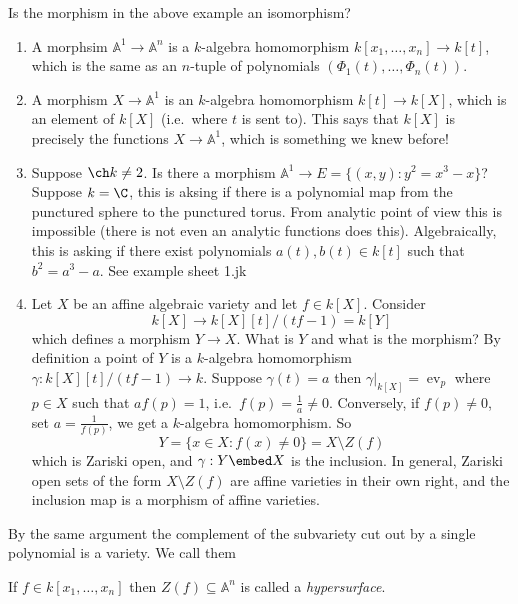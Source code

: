 \documentclass[a4paper]{article}
\renewcommand{\A}{\mathbb{A}}
\begin{document}
\begin{question}
  Is the morphism in the above example an isomorphism?
\end{question}

\begin{eg}\leavevmode
  \begin{enumerate}
  \item A morphsim \(\A^1 \to \A^n\) is a \(k\)-algebra homomorphism \(k[x_1, \dots, x_n] \to k[t]\), which is the same as an \(n\)-tuple of polynomials \((\Phi_1(t), \dots, \Phi_n(t))\).
  \item A morphism \(X \to \A^1\) is an \(k\)-algebra homomorphism \(k[t] \to k[X]\), which is an element of \(k[X]\) (i.e.\ where \(t\) is sent to). This says that \(k[X]\) is precisely the functions \(X \to \A^1\), which is something we knew before!
  \item Suppose \(\ch k \neq 2\). Is there a morphism \(\A^1 \to E = \{(x, y): y^2 = x^3 - x\}\)? Suppose \(k = \C\), this is aksing if there is a polynomial map from the punctured sphere to the punctured torus. From analytic point of view this is impossible (there is not even an analytic functions does this). Algebraically, this is asking if there exist polynomials \(a(t), b(t) \in k[t]\) such that \(b^2 = a^3 - a\). See example sheet 1.jk
  \item Let \(X\) be an affine algebraic variety and let \(f \in k[X]\). Consider
    \[
      k[X] \to k[X][t]/(tf - 1) = k[Y]
    \]
    which defines a morphism \(Y \to X\). What is \(Y\) and what is the morphism? By definition a point of \(Y\) is a \(k\)-algebra homomorphism \(\gamma: k[X][t]/(tf - 1) \to k\). Suppose \(\gamma(t) = a\) then \(\gamma|_{k[X]} = \operatorname{ev}_p\) where \(p \in X\) such that \(a f(p) = 1\), i.e.\ \(f(p) = \frac{1}{a} \neq 0\). Conversely, if \(f(p) \neq 0\), set \(a = \frac{1}{f(p)}\), we get a \(k\)-algebra homomorphism. So
    \[
      Y = \{x \in X: f(x) \neq 0\} = X \setminus Z(f)
    \]
    which is Zariski open, and \(\gamma: Y \embed X\) is the inclusion. In general, Zariski open sets of the form \(X \setminus Z(f)\) are affine varieties in their own right, and the inclusion map is a morphism of affine varieties.
  \end{enumerate}
\end{eg}

By the same argument the complement of the subvariety cut out by a single polynomial is a variety. We call them

\begin{definition}[hypersurface]
  If \(f \in k[x_1, \dots, x_n]\) then \(Z(f) \subseteq \A^n\) is called a \emph{hypersurface}.
\end{definition}
\end{document}
